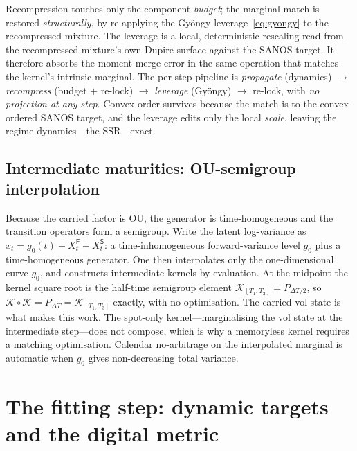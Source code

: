 \documentclass[11pt]{article}
\newcommand{\cK}{\mathcal{K}}
\begin{document}
Recompression touches only the component \emph{budget}; the marginal-match is restored
\emph{structurally}, by re-applying the Gy\"ongy leverage~\eqref{eq:gyongy} to the recompressed
mixture. The leverage is a local, deterministic rescaling read from the recompressed mixture's
own Dupire surface against the SANOS target. It therefore absorbs the moment-merge error in the
same operation that matches the kernel's intrinsic marginal. The per-step pipeline is
\emph{propagate} (dynamics) $\to$ \emph{recompress} (budget $+$ re-lock) $\to$ \emph{leverage}
(Gy\"ongy) $\to$ re-lock, with \emph{no projection at any step}. Convex order survives because
the match is to the convex-ordered SANOS target, and the leverage edits only the local
\emph{scale}, leaving the regime dynamics---the SSR---exact.

\subsection{Intermediate maturities: OU-semigroup interpolation}
\label{sec:interp}
Because the carried factor is OU, the generator is time-homogeneous and the transition operators form
a semigroup. Write the latent log-variance as $x_t=g_0(t)+X^{\mathsf{F}}_t+X^{\mathsf{S}}_t$: a
time-inhomogeneous forward-variance level $g_0$ plus a time-homogeneous generator. One then
interpolates only the one-dimensional curve $g_0$, and constructs intermediate kernels by
evaluation. At the midpoint
the kernel square root is the half-time semigroup element $\cK_{[T_1,T_2]}=P_{\Delta T/2}$, so
$\cK\circ\cK=P_{\Delta T}=\cK_{[T_1,T_3]}$ exactly, with no optimisation. The carried vol state is what
makes this work. The spot-only kernel---marginalising the vol state at the intermediate step---does
not compose, which is why a memoryless kernel requires a matching optimisation. Calendar no-arbitrage on
the interpolated marginal is automatic when $g_0$ gives non-decreasing total variance.

\section{The fitting step: dynamic targets and the digital metric}
\label{sec:rung}
\end{document}

